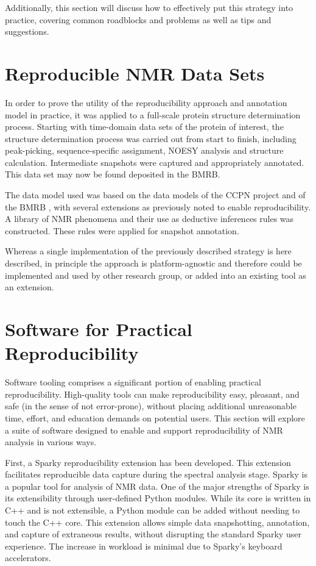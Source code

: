 Additionally, this section will discuss how to effectively put this strategy 
into practice, covering common roadblocks and problems as well as tips and 
suggestions.


\section{Reproducible NMR Data Sets}
In order to prove the utility of the reproducibility approach and annotation 
model in practice, it was applied to a full-scale protein structure 
determination process.  Starting with time-domain data sets of the protein of 
interest, the structure determination process was carried out from start to 
finish, including peak-picking, sequence-specific assignment, NOESY analysis 
and structure calculation.  Intermediate snapshots were captured and 
appropriately annotated.  This data set may now be found deposited in the BMRB.

The data model used was based on the data models of the CCPN project \cite{ccpn}
and of the BMRB \cite{bmrb}, with several 
extensions as previously noted to enable reproducibility.  A library of NMR 
phenomena and their use as deductive inferences rules was constructed.  
These rules were applied for snapshot annotation.

Whereas a single implementation of the previously described strategy is 
here described, in principle the approach is platform-agnostic and 
therefore could be implemented and used by other research group, or added 
into an existing tool as an extension.


\section{Software for Practical Reproducibility}
Software tooling comprises a significant portion of enabling practical 
reproducibility.  High-quality tools can make reproducibility easy, pleasant, 
and safe (in the sense of not error-prone), without placing additional 
unreasonable time, effort, and education demands on potential users.  This 
section will explore a suite of software designed to enable and support 
reproducibility of NMR analysis in various ways.
	
First, a Sparky reproducibility extension has been developed.  This extension
facilitates reproducible data capture during the spectral analysis stage. Sparky 
\cite{sparky} is a popular tool for analysis of NMR data.  One of the major 
strengths of Sparky is its extensibility through user-defined Python modules.  
While its core is written in C++ and is not extensible, a Python module can 
be added without needing to touch the C++ core.  This extension allows
simple data snapshotting, annotation, and capture of extraneous results,
without disrupting the standard Sparky user experience.  The increase in
workload is minimal due to Sparky's keyboard accelerators.

